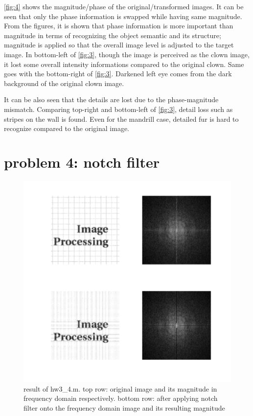 \documentclass[extendedabs]{bmvc2k}
\begin{document}
\figurename{\ref{fig:4}} shows the magnitude/phase of the original/transformed images. It can
be seen that only the phase information is swapped while having same magnitude.
From the figures, it is shown that phase information is more important than magnitude in terms
of recognizing the object semantic and its structure; magnitude is applied so that the overall
image level is adjusted to the target image. In bottom-left of \figurename{\ref{fig:3}},
though the image is perceived as the clown image, it lost some overall intensity informations compared
to the original clown. Same goes with the bottom-right of \figurename{\ref{fig:3}}. Darkened left 
eye comes from the dark background of the original clown image.

It can be also seen that the details are lost due to the phase-magnitude mismatch. 
Comparing top-right and bottom-left of \figurename{\ref{fig:3}}, detail loss such as stripes on the wall
is found. Even for the mandrill case, detailed fur is hard to recognize compared to the original image.


\section*{problem 4: notch filter}

\begin{figure}[h]
    \centering
    \includegraphics[width=\linewidth]{hw3_4_1}
    \caption{result of hw3\_4.m. top row: original image and its magnitude in frequency 
    domain respectively. bottom row: after applying notch filter onto the frequency domain image
    and its resulting magnitude}
    \label{fig:5}
\end{figure}
\end{document}
